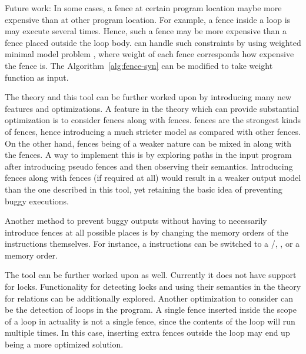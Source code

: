 Future work:
In some cases, a fence at certain program location maybe more expensive 
than at other program location. For example, a fence inside a loop is may 
execute several times. Hence, such a fence may be more expensive than a 
fence placed outside the loop body.
%
\ourtechnique can handle such constraints by using weighted minimal model 
problem , where weight of each fence 
corresponds how expensive the fence is. 
The Algorithm~\ref{alg:fence-syn} can be modified to take weight 
function as input. 

The theory and this tool can be further worked upon
by introducing many new features and optimizations. A feature in the
theory which can provide substantial optimization is to consider
\moar fences along with \mosc fences. \mosc fences are the strongest 
kinds of fences, hence introducing a much stricter model as compared with
other fences. On the other hand, \moar fences
being of a weaker nature can be mixed in along with the \mosc
fences. A way to implement this is by exploring \lsw 
paths in the input program after introducing
pseudo fences and then observing their semantics. Introducing \moar fences
along with \mosc fences (if required at all) would result in a
weaker output model than the one described in this tool, yet retaining
the basic idea of preventing buggy executions.

Another method to prevent buggy outputs without having to necessarily
introduce \mosc fences at all possible places is by changing the 
memory orders of the instructions themselves. For instance, a \morlx 
instructions can be switched to a \morel/\moacq, \moar, or a \mosc memory order.

The tool can be further worked upon as well. Currently it does not have support
for locks. Functionality for detecting locks and using their semantics
in the theory for \lso relations can be additionally explored. Another optimization
to consider can be the detection of loops in the program. A single fence
inserted inside the scope of a loop in actuality is not a single fence, since
the contents of the loop will run multiple times. In this case, inserting extra fences
outside the loop may end up being a more optimized solution.